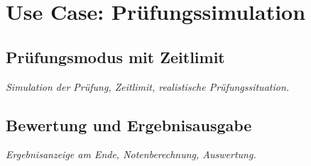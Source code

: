 \section{Use Case: Prüfungssimulation}

\subsection{Prüfungsmodus mit Zeitlimit}
\label{chap:pruefung}
\setauthor{\firstauthor}
\textit{Simulation der Prüfung, Zeitlimit, realistische Prüfungssituation.}

\subsection{Bewertung und Ergebnisausgabe}
\label{chap:review}
\setauthor{\firstauthor}
\textit{Ergebnisanzeige am Ende, Notenberechnung, Auswertung.}